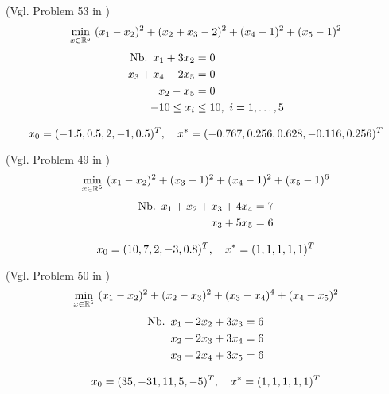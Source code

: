 \begin{testproblem}
(Vgl. Problem 53 in \cite[S.~76]{hock})
\begin{equation}
\min_{x\in\mathbb{R}^5}\ (x_1 - x_2)^2 + (x_2 + x_3 - 2)^2 + (x_4 - 1)^2 + (x_5 - 1)^2
\end{equation}
\begin{equation*}
\begin{split}
\nb x_1 + 3 x_2 & = 0 \\
x_3 + x_4 - 2 x_5 & = 0 \\
x_2 - x_5 & = 0 \\
-10 \leq x_i & \leq 10,\ i = 1,\ldots,5 \\
\end{split}
\end{equation*}

\begin{equation*}
x_0 = (-1.5, 0.5, 2, -1, 0.5)^T,\quad x^* = (-0.767, 0.256, 0.628, -0.116, 0.256)^T
\end{equation*}
\end{testproblem}

\begin{testproblem}
(Vgl. Problem 49 in \cite[S.~72]{hock})
\begin{equation}
\min_{x\in\mathbb{R}^5}\ (x_1-x_2)^2 + (x_3-1)^2 + (x_4-1)^2 + (x_5-1)^6 
\end{equation}
\begin{equation*}
\begin{split}
\nb x_1 + x_2 + x_3 + 4 x_4 & = 7 \\
x_3 + 5 x_5 & = 6 \\
\end{split}
\end{equation*}

\begin{equation*}
x_0 = (10, 7, 2, -3, 0.8)^T,\quad x^* = (1, 1, 1, 1, 1)^T
\end{equation*}
\end{testproblem}

\begin{testproblem}
(Vgl. Problem 50 in \cite[S.~73]{hock})
\begin{equation}
\min_{x\in\mathbb{R}^5}\ (x_1-x_2)^2 + (x_2-x_3)^2 + (x_3-x_4)^4 + (x_4-x_5)^2 
\end{equation}
\begin{equation*}
\begin{split}
\nb x_1 + 2 x_2 + 3 x_3 & = 6 \\
x_2 + 2 x_3 + 3 x_4 & = 6 \\
x_3 + 2 x_4 + 3 x_5 & = 6 \\
\end{split}
\end{equation*}

\begin{equation*}
x_0 = (35, -31, 11, 5, -5)^T,\quad x^* = (1, 1, 1, 1, 1)^T
\end{equation*}
\end{testproblem}

